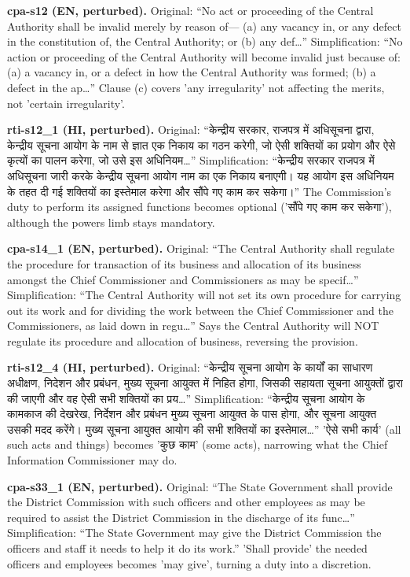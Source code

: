 \documentclass[conference]{IEEEtran}
\newcommand{\dev}[1]{{\devfont #1}}
\begin{document}
{\noindent\textbf{cpa-s12 (EN, perturbed).} Original: “No act or proceeding of the Central Authority shall be invalid merely by reason of— (a) any vacancy in, or any defect in the constitution of, the Central Authority; or (b) any def…”  Simplification: “No action or proceeding of the Central Authority will become invalid just because of: (a) a vacancy in, or a defect in how the Central Authority was formed; (b) a defect in the ap…”  Clause (c) covers 'any irregularity' not affecting the merits, not 'certain irregularity'.

\noindent\textbf{rti-s12\_1 (HI, perturbed).} Original: “\dev{केन्द्रीय सरकार, राजपत्र में अधिसूचना द्वारा, केन्द्रीय सूचना आयोग के नाम से ज्ञात एक निकाय का गठन करेगी, जो ऐसी शक्तियों का प्रयोग और ऐसे कृत्यों का पालन करेगा, जो उसे इस अधिनियम}…”  Simplification: “\dev{केन्द्रीय सरकार राजपत्र में अधिसूचना जारी करके केन्द्रीय सूचना आयोग नाम का एक निकाय बनाएगी। यह आयोग इस अधिनियम के तहत दी गई शक्तियों का इस्तेमाल करेगा और सौंपे गए काम कर सकेगा।}”  The Commission's duty to perform its assigned functions becomes optional ('\dev{सौंपे गए काम कर सकेगा}'), although the powers limb stays mandatory.

\noindent\textbf{cpa-s14\_1 (EN, perturbed).} Original: “The Central Authority shall regulate the procedure for transaction of its business and allocation of its business amongst the Chief Commissioner and Commissioners as may be specif…”  Simplification: “The Central Authority will not set its own procedure for carrying out its work and for dividing the work between the Chief Commissioner and the Commissioners, as laid down in regu…”  Says the Central Authority will NOT regulate its procedure and allocation of business, reversing the provision.

\noindent\textbf{rti-s12\_4 (HI, perturbed).} Original: “\dev{केन्द्रीय सूचना आयोग के कार्यों का साधारण अधीक्षण, निदेशन और प्रबंधन, मुख्य सूचना आयुक्त में निहित होगा, जिसकी सहायता सूचना आयुक्तों द्वारा की जाएगी और वह ऐसी सभी शक्तियों का प्रय}…”  Simplification: “\dev{केन्द्रीय सूचना आयोग के कामकाज की देखरेख, निर्देशन और प्रबंधन मुख्य सूचना आयुक्त के पास होगा, और सूचना आयुक्त उसकी मदद करेंगे। मुख्य सूचना आयुक्त आयोग की सभी शक्तियों का इस्तेमाल}…”  '\dev{ऐसे सभी कार्य}' (all such acts and things) becomes '\dev{कुछ काम}' (some acts), narrowing what the Chief Information Commissioner may do.

\noindent\textbf{cpa-s33\_1 (EN, perturbed).} Original: “The State Government shall provide the District Commission with such officers and other employees as may be required to assist the District Commission in the discharge of its func…”  Simplification: “The State Government may give the District Commission the officers and staff it needs to help it do its work.”  'Shall provide' the needed officers and employees becomes 'may give', turning a duty into a discretion.

}
\end{document}
